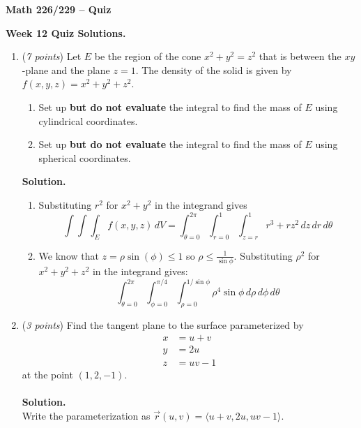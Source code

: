 \documentclass[12 pt]{article}
\begin{document}
	\begin{center}
		\textbf{\hfill Math 226/229 -- Quiz} \\
	\end{center}
	\medskip

	\noindent
	\textbf{Week 12 Quiz Solutions.} \hfill
	\vspace{.1in}
	\hspace*{0.2in}
	\medskip
	\noindent
  \begin{enumerate}
		\item (\textit{7 points})
      Let $E$ be the region of the cone $x^2 + y^2 = z^2$ that is
      between the $xy$-plane and the plane $z = 1$.
      The density of the solid is given by $f(x, y, z) = x^2 + y^2 + z^2$.
      \begin{enumerate}
        \item Set up \textbf{but do not evaluate} the integral to find the mass of $E$ using cylindrical coordinates.
        \item Set up \textbf{but do not evaluate} the integral to find the mass of $E$ using spherical coordinates.
      \end{enumerate}
    \textbf{Solution.}\\
			\begin{enumerate}
				\item Substituting $r^2$ for $x^2 + y^2$ in the integrand gives \[
					\int\int\int_E f(x,y,z)\,dV = \int_{\theta=0}^{2\pi}\int_{r=0}^1\int_{z=r}^1 r^3 + rz^2 \,dz\, dr\, d\theta
				\]
				\item We know that $z = \rho\sin(\phi) \leq 1$ so $\rho \leq \frac{1}{\sin\phi}$. Substituting $\rho^2$ for $x^2 + y^2 + z^2$ in the integrand gives: \[
					\int_{\theta=0}^{2\pi}\int_{\phi=0}^{\pi/4}\int_{\rho=0}^{1/\sin\phi} \rho^4\sin\phi \,d\rho\, d\phi\, d\theta
				\]
			\end{enumerate}
		\pagebreak
		\item (\textit{3 points}) Find the tangent plane to the surface
		parameterized by \begin{align*}
			x &= u + v \\
			y &= 2u \\
			z &= uv - 1
		\end{align*} at the point $(1,2,-1)$.
    \\~\\
    \textbf{Solution.}\\
		Write the parameterization as $\vec r(u, v) = \langle u + v, 2u, uv - 1 \rangle$.

\end{enumerate}
\end{document}
